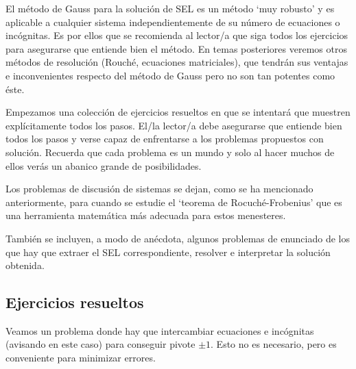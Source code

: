	
El método de Gauss para la solución de SEL es un método `muy robusto' y es aplicable a cualquier sistema independientemente de su número de ecuaciones o incógnitas. Es por ellos que se recomienda al lector/a que siga todos los ejercicios para asegurarse que entiende bien el método. En temas posteriores veremos otros métodos de resolución (Rouché, ecuaciones matriciales), que tendrán sus ventajas e inconvenientes respecto del método de Gauss pero no son tan potentes como éste.
 
Empezamos una colección de ejercicios resueltos en que se intentará que muestren explícitamente todos los pasos. El/la lector/a debe asegurarse que entiende bien todos los pasos y verse capaz de enfrentarse a los problemas propuestos con solución. Recuerda que cada problema es un mundo y solo al hacer muchos de ellos verás un abanico grande de posibilidades.

Los problemas de discusión de sistemas se dejan, como se ha mencionado anteriormente, para cuando se estudie el `teorema de Rocuché-Frobenius' que es una herramienta matemática más adecuada para estos menesteres.

También se incluyen, a modo de anécdota, algunos problemas de enunciado de los que hay que extraer el SEL correspondiente, resolver e interpretar la solución obtenida.
\subsection{Ejercicios resueltos}

Veamos un problema donde hay que intercambiar ecuaciones e incógnitas (avisando en este caso) para conseguir pivote $\pm 1$. Esto no es necesario, pero es conveniente para minimizar errores.

